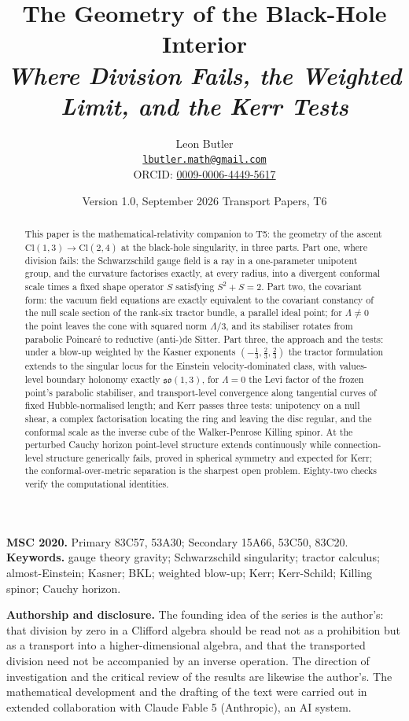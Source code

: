 \documentclass[11pt]{article}
\title{\bfseries The Geometry of the Black-Hole Interior\\[4pt]
  \large\itshape Where Division Fails, the Weighted Limit, and the Kerr Tests}
\author{Leon Butler\\ \normalsize\href{mailto:lbutler.math@gmail.com}{\texttt{lbutler.math@gmail.com}}\\ \normalsize ORCID: \href{https://orcid.org/0009-0006-4449-5617}{0009-0006-4449-5617}}
\date{Version 1.0, September 2026 \textperiodcentered{} Transport Papers, T6}
\theoremstyle{definition}
\newcommand{\Cl}{\mathrm{Cl}}
\begin{document}
\maketitle

\begin{abstract}
\normalsize
This paper is the mathematical-relativity companion to T5: the geometry of the ascent $\Cl(1,3) \to \Cl(2,4)$ at the black-hole singularity, in three parts. Part one, where division fails: the Schwarzschild gauge field is a ray in a one-parameter unipotent group, and the curvature factorises exactly, at every radius, into a divergent conformal scale times a fixed shape operator $S$ satisfying $S^2 + S = 2$. Part two, the covariant form: the vacuum field equations are exactly equivalent to the covariant constancy of the null scale section of the rank-six tractor bundle, a parallel ideal point; for $\Lambda \neq 0$ the point leaves the cone with squared norm $\Lambda/3$, and its stabiliser rotates from parabolic Poincar\'e to reductive (anti-)de Sitter. Part three, the approach and the tests: under a blow-up weighted by the Kasner exponents $(-\tfrac13, \tfrac23, \tfrac23)$ the tractor formulation extends to the singular locus for the Einstein velocity-dominated class, with values-level boundary holonomy exactly $\mathfrak{so}(1,3)$, for $\Lambda = 0$ the Levi factor of the frozen point's parabolic stabiliser, and transport-level convergence along tangential curves of fixed Hubble-normalised length; and Kerr passes three tests: unipotency on a null shear, a complex factorisation locating the ring and leaving the disc regular, and the conformal scale as the inverse cube of the Walker-Penrose Killing spinor. At the perturbed Cauchy horizon point-level structure extends continuously while connection-level structure generically fails, proved in spherical symmetry and expected for Kerr; the conformal-over-metric separation is the sharpest open problem. Eighty-two checks verify the computational identities.
\end{abstract}

\medskip
\noindent\textbf{MSC 2020.} Primary 83C57, 53A30; Secondary 15A66, 53C50, 83C20.\\
\textbf{Keywords.} gauge theory gravity; Schwarzschild singularity; tractor calculus; almost-Einstein; Kasner; BKL; weighted blow-up; Kerr; Kerr-Schild; Killing spinor; Cauchy horizon.

\newpage
\textbf{Authorship and disclosure. }The founding idea of the series is the author's: that division by zero in a Clifford algebra should be read not as a prohibition but as a transport into a higher-dimensional algebra, and that the transported division need not be accompanied by an inverse operation. The direction of investigation and the critical review of the results are likewise the author's. The mathematical development and the drafting of the text were carried out in extended collaboration with Claude Fable 5 (Anthropic), an AI system.
\end{document}
